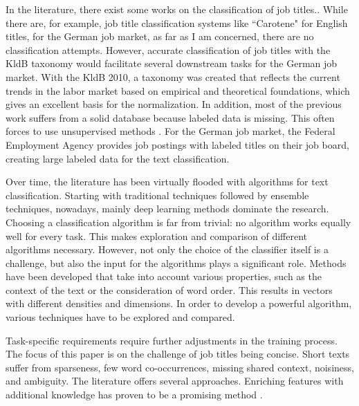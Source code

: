 \documentclass[12pt, a4paper, titlepage]{article}
\begin{document}
In the literature, there exist some works on the classification of job titles.\citep{zhu2016, javed2015, decorte2021, wang2019,neculoiu2016}. While there are, for example, job title classification systems like ``Carotene" \citet{javed2015} for English titles, for the German job market, as far as I am concerned, there are no classification attempts. However, accurate classification of job titles with the \ac{KldB} taxonomy would facilitate several downstream tasks for the German job market. With the \ac{KldB} 2010, a taxonomy was created that reflects the current trends in the labor market based on empirical and theoretical foundations, which gives an excellent basis for the normalization. In addition, most of the previous work suffers from a solid database because labeled data is missing. This often forces to use unsupervised methods \citep{decorte2021, javed2015}. For the German job market, the Federal Employment Agency provides job postings with labeled titles on their job board, creating large labeled data for the text classification. 

Over time, the literature has been virtually flooded with algorithms for text classification. Starting with traditional techniques followed by ensemble techniques, nowadays, mainly deep learning methods dominate the research. Choosing a classification algorithm is far from trivial: no algorithm works equally well for every task. This makes exploration and comparison of different algorithms necessary. However, not only the choice of the classifier itself is a challenge, but also the input for the algorithms plays a significant role. Methods have been developed that take into account various properties, such as the context of the text or the consideration of word order. This results in vectors with different densities and dimensions. In order to develop a powerful algorithm, various techniques have to be explored and compared.

Task-specific requirements require further adjustments in the training process. The focus of this paper is on the challenge of job titles being concise. Short texts suffer from sparseness, few word co-occurrences,  missing shared context, noisiness, and ambiguity. The literature offers several approaches. Enriching features with additional knowledge has proven to be a promising method \citep{WangF2014, wang2017J}.
\end{document}
